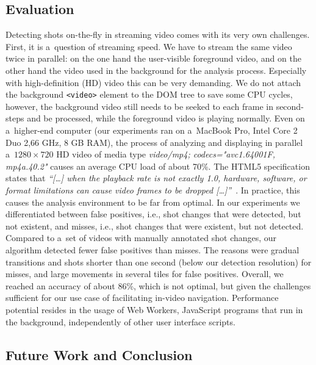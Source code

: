 \subsection{Evaluation} \label{sec:evaluation}
Detecting shots on-the-fly in streaming video comes with its very own challenges. First, it is a~question of streaming speed. We have to stream the same video twice in parallel: on the one hand the user-visible foreground video, and on the other hand the video used in the background for the analysis process. Especially with high-definition (HD) video this can be very demanding. We do not attach the background \texttt{<video>} element to the DOM tree to save some CPU cycles, however, the background video still needs to be seeked to each frame in second-steps and be processed, while the foreground video is playing normally. Even on a~higher-end computer (our experiments ran on a~MacBook Pro, Intel Core 2 Duo 2,66 GHz, 8 GB RAM), the process of analyzing and displaying in parallel a~$\mathit{1280} \times \mathit{720}$ HD video of media type \emph{video/mp4; codecs="avc1.64001F, mp4a.40.2"} causes an average CPU load of about 70\%. The HTML5 specification states that \textit{``[\ldots] when the playback rate is not exactly 1.0, hardware, software, or format limitations can cause video frames to be dropped [\ldots]''}~\cite{whatwgvideo}. In practice, this causes the analysis environment to be far from optimal. In our experiments we differentiated between false positives, i.e., shot changes that were detected, but not existent, and misses, i.e., shot changes that were existent, but not detected. Compared to a~set of videos with manually annotated shot changes, our algorithm detected fewer false positives than misses. The reasons were gradual transitions and shots shorter than one second (below our detection resolution) for misses, and large movements in several tiles for false positives. Overall, we reached an accuracy of about 86\%, which is not optimal, but given the challenges sufficient for our use case of facilitating in-video navigation. 
Performance potential resides in the usage of Web Workers,
JavaScript programs that run in the background, independently of other user interface scripts.

\subsection{Future Work and Conclusion} \label{sec:future-work-conclusion}

